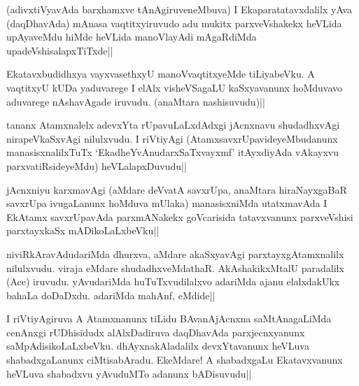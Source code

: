 \begin{artha} 
(adivxtiVyavAda barxhamxve tAnAgiruveneMbuva) I Ekaparatatavxdalilx 
yAva (daqDhavAda) mAnasa vaqtitxyiruvudo adu mukitx parxveVshakekx 
heVLida upAyaveMdu hiMde heVLida manoVlayAdi mAgaRdiMda 
upadeVshisalapxTiTxde||
\end{artha}


\begin{artha} 
Ekatavxbudidhxya vayxvasethxyU manoVvaqtitxyeMde tiLiyabeVku. A 
vaqtitxyU kUDa yaduvarege I elAlx visheVSagaLU kaSxyavanunx hoMduvavo 
aduvarege nAshavAgade iruvudu. (anaMtara nashisuvudu)||
\end{artha}


\begin{artha} 
tananx Atamxnalelx adevxYta rUpavuLaLxdAdxgi jAcnxnavu shudadhxvAgi 
nirapeVkaSxvAgi nilulxvudu. I riVtiyAgi (AtamxsavxrUpavideyeMbudanunx 
manasisxnalilxTuTx `EkadheYvAnudarxSaTxvayxmf' itAyxdiyAda vAkayxvu 
parxvatiRsideyeMdu) heVLalapxDuvudu||
\end{artha}


\begin{artha} 
jAcnxniyu karxmavAgi (aMdare deVvatA savxrUpa, anaMtara hiraNayxgaBaR 
savxrUpa ivugaLanunx hoMduva mUlaka) manasisxniMda utatxmavAda I 
EkAtamx savxrUpavAda parxmANakekx goVcarisida tatavxvanunx 
parxveVshisi parxtayxkaSx mADikoLaLxbeVku||
\end{artha}


\begin{artha} 
niviRkAravAdudariMda dhurxva, aMdare akaSxyavAgi parxtayxgAtamxnalilx 
nilulxvudu. viraja eMdare shudadhxveMdathaR. AkAshakikxMtalU 
paradalilx (Ace) iruvudu. yAvudariMda huTuTxvudilalxvo adariMda ajanu 
elalxdakUkx bahaLa doDaDxdu. adariMda mahAnf, eMdide||
\end{artha}


\begin{artha} 
I riVtiyAgiruva A Atamxnanunx tiLidu BAvanAjAcnxna saMtAnagaLiMda 
cenAnxgi rUDhisidudx alAlxDadiruva daqDhavAda parxjecnxyanunx 
saMpAdisikoLaLxbeVku. dhAyxnakAladalilx devxYtavanunx heVLuva 
shabadxgaLanunx ciMtisabAradu. EkeMdare! A shabadxgaLu Ekatavxvanunx 
heVLuva shabadxvu yAvuduMTo adanunx bADisuvudu||
\end{artha}

